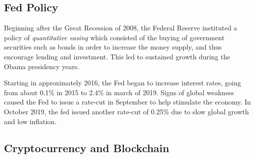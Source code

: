 		\subsection{Fed Policy}
		
		Beginning after the Great Recession of 2008, the Federal Reserve instituted a policy of \textit{quantitative easing} which consisted of the buying of government securities such as bonds in order to increase the money supply, and thus encourage lending and investment.  This led to sustained growth during the Obama presidency years.  
		
		Starting in approximately 2016, the Fed began to increase interest rates, going from about 0.1\% in 2015 to 2.4\% in march of 2019.  Signs of global weakness caused the Fed to issue a rate-cut in September to help stimulate the economy.  In October 2019, the fed issued another rate-cut of 0.25\% due to slow global growth and low inflation.  
		
		
		
		
		
		\subsection{Cryptocurrency and Blockchain}
		\def\bitcoinA{%
			\leavevmode
			\vtop{\offinterlineskip %
				\setbox0=\hbox{B}%
				\setbox2=\hbox to\wd0{\hfil\hskip-.03em
					\vrule height .3ex width .15ex\hskip .08em
					\vrule height .3ex width .15ex\hfil}
				\vbox{\copy2\box0}\box2}}
		
